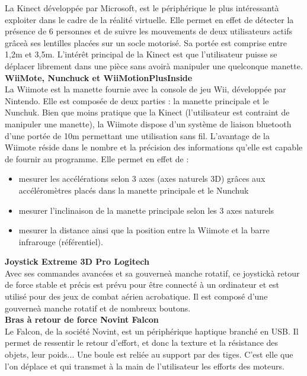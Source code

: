 La Kinect développée par Microsoft, est le périphérique le plus intéressantà exploiter dans le cadre de la réalité virtuelle. Elle permet en effet de détecter la présence de 6 personnes et de suivre les mouvements de deux utilisateurs actifs grâceà ses lentilles placées sur un socle motorisé. Sa portée est comprise entre 1,2m et 3,5m. L'intérêt principal de la Kinect est que l'utilisateur puisse se déplacer librement dans une pièce sans avoirà manipuler une quelconque manette.
\\

\textbf{WiiMote, Nunchuck et WiiMotionPlusInside}
\\

La Wiimote est la manette fournie avec la console de jeu Wii, développée par Nintendo. Elle est composée de deux parties : la manette principale et le Nunchuk. Bien que moins pratique que la Kinect (l'utilisateur est contraint de manipuler une manette), la Wiimote dispose d'un système de liaison bluetooth d'une portée de 10m permettant une utilisation sans fil. L'avantage de la Wiimote réside dans le nombre et la précision des informations qu'elle est capable de fournir au programme. 
\newline
Elle permet en effet de :
\begin{itemize}
  \item mesurer les accélérations selon 3 axes (axes naturels 3D) grâces aux accéléromètres placés dans la manette principale et le Nunchuk
  \item mesurer l'inclinaison de la manette principale selon les 3 axes naturels
  \item mesurer la distance ainsi que la position entre la Wiimote et la barre infrarouge (référentiel).
\end{itemize}

\textbf{Joystick Extreme 3D Pro Logitech}
\\

Avec ses commandes avancées et sa gouverneà manche rotatif, ce joystickà retour de force stable et précis est prévu pour être connecté à un ordinateur et est utilisé pour des jeux de combat aérien acrobatique. Il est composé d'une gouverneà manche rotatif et de nombreux boutons.
\\

\textbf{Bras à retour de force Novint Falcon}
\\

Le Falcon, de la société Novint, est un périphérique haptique branché en USB. Il permet de ressentir le retour d'effort, et donc la texture et la résistance des objets, leur poids... Une boule est reliée au support par des tiges. C'est elle que l'on déplace et qui transmet à la main de l'utilisateur les efforts des moteurs.
\\

